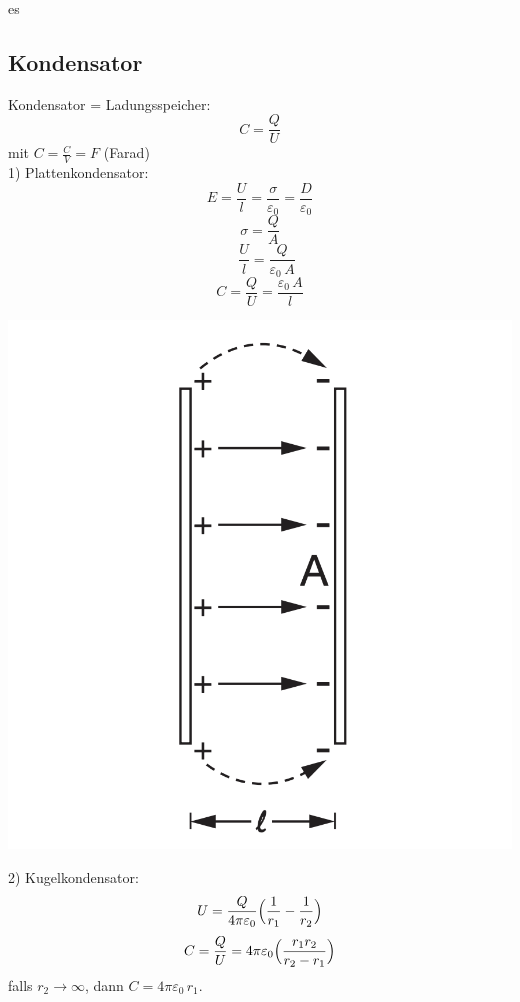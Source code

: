 es\documentclass[a4paper, fontsize=8pt, landscape]{scrartcl}
\begin{document}
\begin{multicols*}{4}
    \subsection{Kondensator}
        Kondensator = Ladungsspeicher:
        \[C = \frac{Q}{U}\]
        mit $C = \frac{C}{V}= F$ (Farad)\\
        1) Plattenkondensator:
        \[E = \frac{U}{l} = \frac{\sigma}{\varepsilon_0} = \frac{D}{\varepsilon_0}\]
        \[\sigma = \frac{Q}{A}\]
        \[\quad \frac{U}{l} = \frac{Q}{\varepsilon_0\,A}\]
        \[C = \frac{Q}{U} = \frac{\varepsilon_0\,A}{l}\]
        \begin{center}
            \includegraphics[scale=0.1]{Images/Plattenkondesator.png}
        \end{center}
        2) Kugelkondensator:
        \[U = \frac{Q}{4\pi\varepsilon_0}\Bigl(\frac{1}{r_1} - \frac{1}{r_2}\Bigr)\]
        \[C = \frac{Q}{U} = 4\pi\varepsilon_0\Bigl(\frac{r_1 r_2}{r_2 - r_1}\Bigr)\]
        falls $r_2 \rightarrow \infty$, dann $C = 4\pi\varepsilon_0\,r_1$.
        \begin{center}

\end{center}
\end{multicols*}
\end{document}
